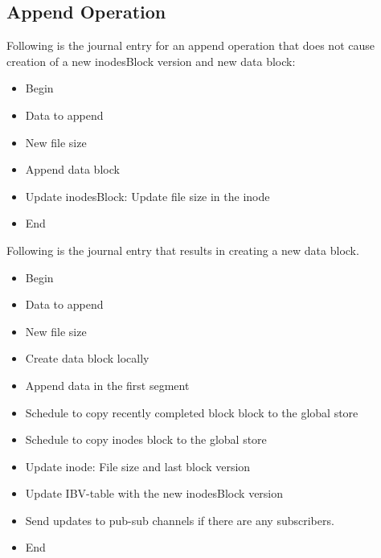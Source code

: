 \documentclass[]{article}
\begin{document}
\subsection{Append Operation}

Following is the journal entry for an append operation that does not cause creation
of a new inodesBlock version and new data block:

\begin{itemize}

\item Begin
\item Data to append
\item New file size
\item Append data block
\item Update inodesBlock: Update file size in the inode
\item End

\end{itemize}


Following is the journal entry that results in creating a new data block.

\begin{itemize}

\item Begin
\item Data to append
\item New file size
\item Create data block locally
\item Append data in the first segment
\item Schedule to copy recently completed block block to the global store
\item Schedule to copy inodes block to the global store
\item Update inode: File size and last block version
\item Update IBV-table with the new inodesBlock version
\item Send updates to pub-sub channels if there are any subscribers.
\item End

\end{itemize}


%
%
\end{document}
